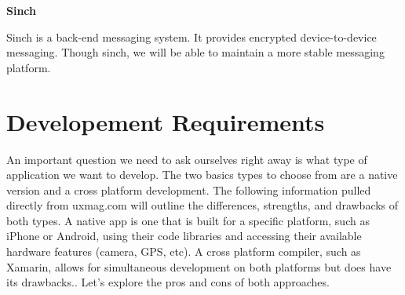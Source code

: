 \noindent
\textbf{Sinch}

Sinch is a back-end messaging system. It provides encrypted device-to-device messaging. Though sinch, we will be able to maintain a more stable messaging platform.




\section{Developement Requirements}

An important question we need to ask ourselves right away is what type of application we want to develop. The two basics types to choose from are a native version and a cross platform development.  The following information pulled directly from uxmag.com will outline the differences, strengths, and drawbacks of both types.
A native app is one that is built for a specific platform, such as iPhone or Android, using their code libraries and accessing their available hardware features (camera, GPS, etc). A cross platform compiler, such as Xamarin, allows for simultaneous development on both platforms but does have its drawbacks.. Let's explore the pros and cons of both approaches.




